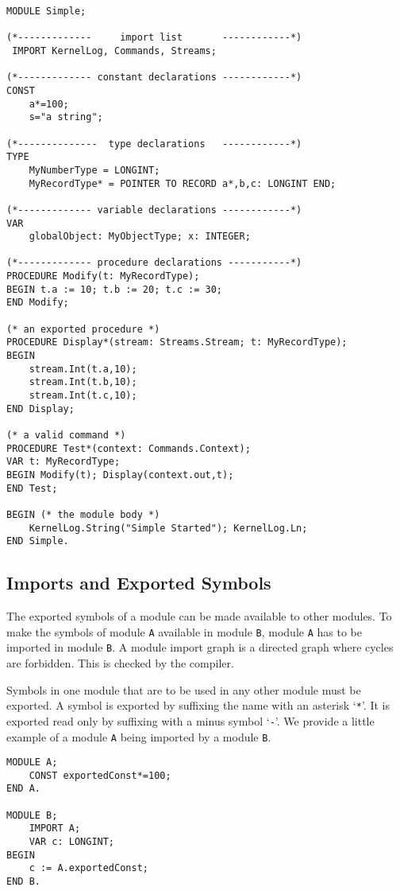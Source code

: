 \documentclass[a4paper,11pt]{article}
\begin{document}
\begin{lstlisting}[language=Oberon,frame=none,caption={A useless module containing constants, types, variables and procedures}]
MODULE Simple;

(*-------------     import list       ------------*)
 IMPORT KernelLog, Commands, Streams;

(*------------- constant declarations ------------*)
CONST
    a*=100;
    s="a string";

(*--------------  type declarations   ------------*)
TYPE
    MyNumberType = LONGINT;
    MyRecordType* = POINTER TO RECORD a*,b,c: LONGINT END;

(*------------- variable declarations ------------*)
VAR
    globalObject: MyObjectType; x: INTEGER;

(*------------- procedure declarations -----------*)
PROCEDURE Modify(t: MyRecordType);
BEGIN t.a := 10; t.b := 20; t.c := 30;
END Modify;

(* an exported procedure *)
PROCEDURE Display*(stream: Streams.Stream; t: MyRecordType);
BEGIN
    stream.Int(t.a,10);
    stream.Int(t.b,10);
    stream.Int(t.c,10);
END Display;

(* a valid command *)
PROCEDURE Test*(context: Commands.Context);
VAR t: MyRecordType;
BEGIN Modify(t); Display(context.out,t);
END Test;

BEGIN (* the module body *)
    KernelLog.String("Simple Started"); KernelLog.Ln;
END Simple.
\end{lstlisting}

\subsection{Imports and Exported Symbols} \label{subsection:Imports}
The exported symbols of a module can be made available to other modules. To make the symbols of module \verb+A+ available in module \verb+B+, module \verb+A+ has to be imported in module \verb+B+. A module import graph is a directed graph where cycles are forbidden. This is checked by the compiler.

Symbols in one module that are to be used in any other module must be exported. A symbol is exported by suffixing the name with an asterisk `\verb+*+'. It is exported read only by suffixing with a minus symbol `\verb+-+'. We provide a little example of a module \verb+A+ being imported by a module \verb+B+.

\begin{lstlisting}[language=Oberon,frame=none,caption={B imports A}]
MODULE A;
    CONST exportedConst*=100;
END A.

MODULE B;
    IMPORT A;
    VAR c: LONGINT;
BEGIN
    c := A.exportedConst;
END B.
\end{lstlisting}
\end{document}

